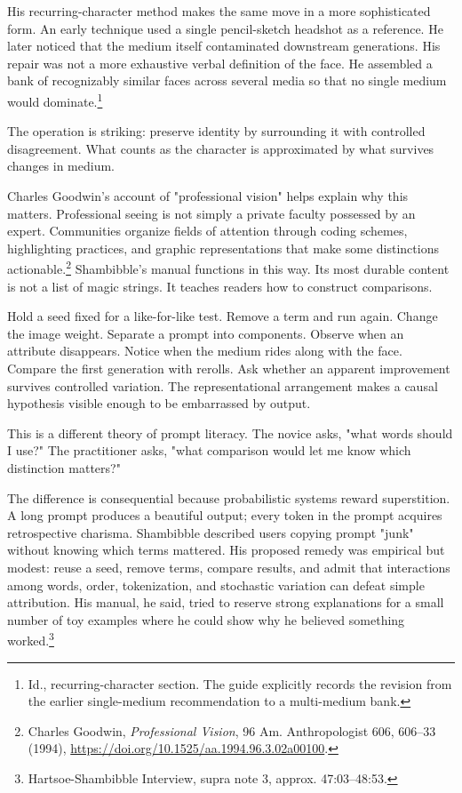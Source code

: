 \documentclass[11pt]{article}
\begin{document}
His recurring-character method makes the same move in a more sophisticated form. An early technique used a single pencil-sketch headshot as a reference. He later noticed that the medium itself contaminated downstream generations. His repair was not a more exhaustive verbal definition of the face. He assembled a bank of recognizably similar faces across several media so that no single medium would dominate.\footnote{Id., recurring-character section. The guide explicitly records the revision from the earlier single-medium recommendation to a multi-medium bank.}

The operation is striking: preserve identity by surrounding it with controlled disagreement. What counts as the character is approximated by what survives changes in medium.

Charles Goodwin's account of "professional vision" helps explain why this matters. Professional seeing is not simply a private faculty possessed by an expert. Communities organize fields of attention through coding schemes, highlighting practices, and graphic representations that make some distinctions actionable.\footnote{Charles Goodwin, \textit{Professional Vision}, 96 Am. Anthropologist 606, 606--33 (1994), \url{https://doi.org/10.1525/aa.1994.96.3.02a00100}.} Shambibble's manual functions in this way. Its most durable content is not a list of magic strings. It teaches readers how to construct comparisons.

Hold a seed fixed for a like-for-like test. Remove a term and run again. Change the image weight. Separate a prompt into components. Observe when an attribute disappears. Notice when the medium rides along with the face. Compare the first generation with rerolls. Ask whether an apparent improvement survives controlled variation. The representational arrangement makes a causal hypothesis visible enough to be embarrassed by output.

This is a different theory of prompt literacy. The novice asks, "what words should I use?" The practitioner asks, "what comparison would let me know which distinction matters?"

The difference is consequential because probabilistic systems reward superstition. A long prompt produces a beautiful output; every token in the prompt acquires retrospective charisma. Shambibble described users copying prompt "junk" without knowing which terms mattered. His proposed remedy was empirical but modest: reuse a seed, remove terms, compare results, and admit that interactions among words, order, tokenization, and stochastic variation can defeat simple attribution. His manual, he said, tried to reserve strong explanations for a small number of toy examples where he could show why he believed something worked.\footnote{Hartsoe-Shambibble Interview, supra note 3, approx. 47:03--48:53.}
\end{document}
